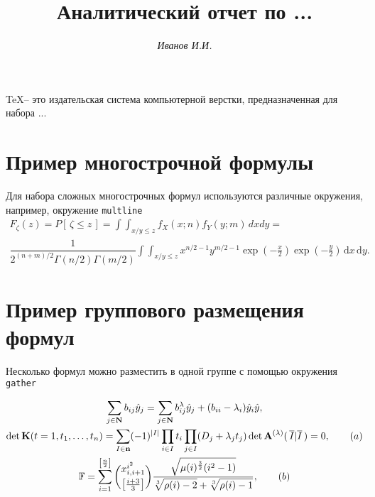 \documentclass{article}
\begin{document}
\title{Аналитический отчет по ...} %
\author{\itshape Иванов И.И.} %
\date{} %
\maketitle %

\thispagestyle{fancy}

\TeX -- это издательская система компьютерной верстки, предназначенная для набора ...


\tableofcontents

\section{Пример многострочной формулы}
    Для набора сложных многострочных формул используются различные окружения, например, окружение \texttt{multline}
	\begin{multline}\label{eq:FunRasp}
		F_{\zeta}(z)=P[\,\zeta\leqslant z\,] = \int\!\!\!\int_{x/y\leqslant z}f_X(x;n)f_Y(y;m)\,dxdy =\\ \dfrac{1}{2^{(n+m)/2}\Gamma(n/2)\Gamma(m/2)}\int\!\!\!\int_{x/y\leqslant z}x^{n/2-1}y^{m/2-1}\exp\left( -\frac{x}{2} \right) \exp\left( -\frac{y}{2} \right) \,\mathrm{d}x \, \mathrm{d}y.
	\end{multline}

\section{Пример группового размещения формул}

Несколько формул можно разместить в одной группе с помощью окружения \texttt{gather}

\begin{gather}
	\sum_{j \in \mathbf{N}} b_{ij} \hat{y}_{j} = \sum_{j \in \mathbf{N}} b_{ij}^\lambda \hat{y}_j + (b_{ii} - \lambda_i)\hat{y}_i \hat{y},\notag \\
	\det \mathbf{K}(t=1, t_1, \ldots, t_n) = \sum_{I \in \mathbf{n} } (-1)^{|I|} \prod_{i \in I} t_i \prod_{j \in I} (D_j + \lambda_j t_j) \det \mathbf{A}^{(\lambda)} (\, \overline{I} | \overline{I} \,) = 0,\tag{$a$} \\
	\mathbb{F} = \sum_{i=1}^{\left[ \frac{n}{2}\right] } \binom{ x_{i,i+1}^{i^2}}{ \left[ \frac{i+3}{3} \right]} {{\sqrt{\mu(i)^\frac{3}{2} (i^2-1)}} \over\displaystyle {\sqrt[3]{\rho(i)-2} + \sqrt[3]{\rho(i)-1}} }, \tag{$b$}
\end{gather}
\end{document}
